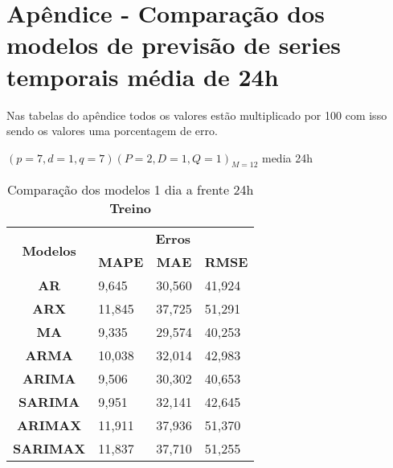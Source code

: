 
\section{Ap\^endice - Compara\c c\~ao dos modelos de previs\~ao de series temporais m\'edia de 24h}\label{sec:comtb24}

Nas tabelas do apêndice todos os valores estão multiplicado por 100 com isso sendo os valores uma porcentagem de erro.

$(p = 7,d = 1,q = 7) (P = 2,D = 1,Q = 1)_{M = 12}$ media 24h
	\begin{table}[H]
	\centering
	\caption{Comparação dos modelos 1 dia a frente 24h \textbf{Treino} }\label{tb:1-24trn}
	\begin{tabular}{@{}clll@{}}
		\toprule
		\multirow{2}{*}{\textbf{Modelos}} & \multicolumn{3}{c}{\textbf{Erros}}                                                                       \\ \cmidrule(l){2-4} 
		& \multicolumn{1}{c}{\textbf{MAPE}} & \multicolumn{1}{c}{\textbf{MAE}} & \multicolumn{1}{c}{\textbf{RMSE}} \\ \hline
\textbf{AR}                       & 9,645                             & 30,560                           & 41,924                            \\
\textbf{ARX}                      & 11,845                            & 37,725                           & 51,291                            \\
\textbf{MA}                       & 9,335                             & 29,574                           & 40,253                            \\
\textbf{ARMA}                     & 10,038                            & 32,014                           & 42,983                            \\
\textbf{ARIMA}                    & 9,506                             & 30,302                           & 40,653                            \\
\textbf{SARIMA}                   & 9,951                             & 32,141                           & 42,645                            \\
\textbf{ARIMAX}                   & 11,911                            & 37,936                           & 51,370                            \\
\textbf{SARIMAX}                  & 11,837                            & 37,710                           & 51,255                            \\

\end{tabular}
\end{table}
